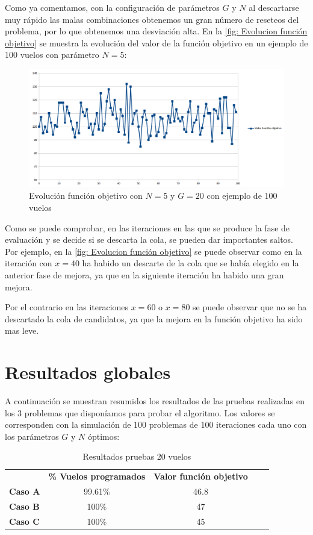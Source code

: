 Como ya comentamos, con la configuración de parámetros $G$ y $N$ al descartarse muy rápido las malas combinaciones obtenemos un gran número de reseteos del problema, por lo que obtenemos una desviación alta. En la \autoref{fig: Evolucion función objetivo} se muestra la evolución del valor de la función objetivo en un ejemplo de 100 vuelos con parámetro $N=5$: 
\begin{figure}[H]
	\begin{center}
		\centering
		\includegraphics[width=1\textwidth]{./imagenes/resultados/evolucionFuncionObjetivo.png}
		\caption{Evolución función objetivo con $N=5$ y $G=20$ con ejemplo de 100 vuelos}
		\label{fig: Evolucion función objetivo}
	\end{center}
\end{figure}
Como se puede comprobar, en las iteraciones en las que se produce la fase de evaluación y se decide si se descarta la cola, se pueden dar importantes saltos. Por ejemplo, en la \autoref{fig: Evolucion función objetivo} se puede observar como en la iteración con $x=40$ ha habido un descarte de la cola que se había elegido en la anterior fase de mejora, ya que en la siguiente iteración ha habido una gran mejora.

Por el contrario en las iteraciones $x=60$ o $x=80$ se puede observar que no se ha descartado la cola de candidatos, ya que la mejora en la función objetivo ha sido mas leve.

\section{Resultados globales}
A continuación se muestran resumidos los resultados de las pruebas realizadas en los 3 problemas que disponíamos para probar el algoritmo. Los valores se corresponden con la simulación de 100 problemas de 100 iteraciones cada uno con los parámetros $G$ y $N$ óptimos:
\begin{table}[H]
	\centering
	\caption{Resultados pruebas 20 vuelos}
	\label{resultados 20 vuelos}
	\begin{tabular}{lllll}
		& \textbf{\% Vuelos programados} & \textbf{Valor función objetivo} & \textbf{} & \textbf{} \\
		\textbf{Caso A} & \multicolumn{1}{c}{99.61\%} &\multicolumn{1}{c}{46.8} & &\\
		\textbf{Caso B} & \multicolumn{1}{c}{100\% }    &\multicolumn{1}{c}{47} & &\\
		\textbf{Caso C} & \multicolumn{1}{c}{100\%}    &\multicolumn{1}{c}{45} & &
	\end{tabular}
\end{table}


